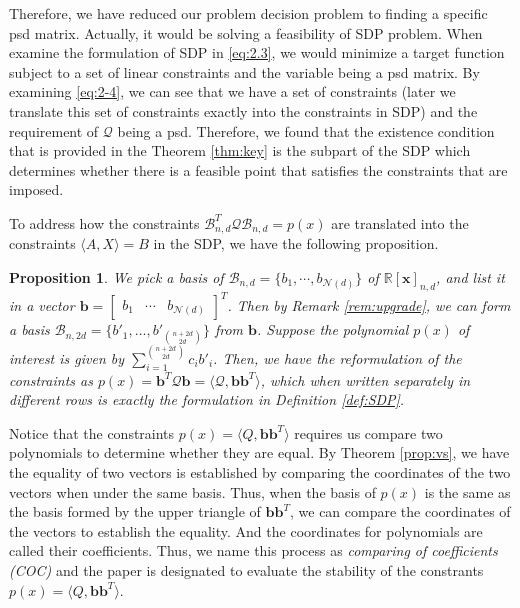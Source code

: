 \documentclass[12pt]{amsart}
\numberwithin{equation}{section}
\newtheorem{prop}[thm]{Proposition}
\theoremstyle{definition}
\numberwithin{thm}{section}
\begin{document}
\smallskip
Therefore, we have reduced our problem decision problem to finding a specific psd matrix. 
Actually, it would be solving a feasibility of SDP problem.
When examine the formulation of SDP in \eqref{eq:2.3}, we would minimize a target function subject to a set of linear constraints and the variable being a psd matrix. 
By examining \eqref{eq:2-4}, we can see that we have a set of constraints (later we translate this set of constraints exactly into the constraints in SDP) 
and the requirement of $\mathcal{Q}$ being a psd.
Therefore, we found that the existence condition that is provided in the Theorem \ref{thm:key} is the subpart of the SDP
which determines whether there is a feasible point that satisfies the constraints that are imposed. 

To address how the constraints $\mathcal{B}_{n, d} ^ T \mathcal{Q} \mathcal{B}_{n, d} = p(x)$ are translated into the constraints $\langle A, X \rangle = B$ in the SDP, we have the following proposition.

\begin{prop}
     \label{prop:2.19}
     We pick a basis of $\mathcal{B}_{n, d} = \{b_1, \cdots, b_{\mathcal{N}(d)}\}$ of $\mathbb{R}[\mathbf{x}]_{n, d}$, and list it in a vector $ \mathbf{b} =\begin{bmatrix}
          b_1 &
          \cdots &
          b_{\mathcal{N}(d)}
     \end{bmatrix} ^ T$. Then by Remark \ref{rem:upgrade}, we can form a basis $\mathcal{B}_{n, 2d} = \{b'_1, ..., b'_{n + 2d \choose 2d}\}$ from $\mathbf{b}$. 
     Suppose the polynomial $p(x)$ of interest is given by $\sum_{i = 1}^{n + 2d \choose 2d } c_i b'_i$.
     Then, we have the reformulation of the constraints as $p(x) = \mathbf{b}^T \mathcal{Q} \mathbf{b} = \langle \mathcal{Q}, \mathbf{bb}^T \rangle$, 
     which when written separately in different rows is exactly the formulation in Definition \ref{def:SDP}.
\end{prop}

Notice that the constraints $p(x) = \langle Q, \mathbf{bb}^T \rangle$ requires us compare two polynomials to determine whether they are equal. 
By Theorem \ref{prop:vs}, we have the equality of two vectors is established by comparing the coordinates of the two vectors when under the same basis. 
Thus, when the basis of $p(x)$ is the same as the basis formed by the upper triangle of $\mathbf{bb}^T$, we can compare the 
coordinates of the vectors to establish the equality. And the coordinates for polynomials are called their coefficients. 
Thus, we name this process as \emph{comparing of coefficients (COC)} and the paper is designated to evaluate the stability of the constrants $p(x) = \langle Q, \mathbf{bb}^T \rangle$.
\end{document}
